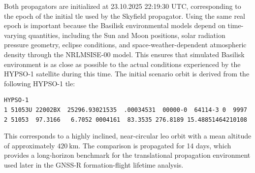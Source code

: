 Both propagators are initialized at 23.10.2025 22:19:30 UTC, corresponding to the epoch of the initial \gls{tle} used by the Skyfield propagator. Using the same real epoch is important because the Basilisk environmental models depend on time-varying quantities, including the Sun and Moon positions, solar radiation pressure geometry, eclipse conditions, and space-weather-dependent atmospheric density through the NRLMSISE-00 model. This ensures that simulated Basilisk environment is as close as possible to the actual conditions experienced by the HYPSO-1 satellite during this time. The initial scenario orbit is derived from the following HYPSO-1 \gls{tle}:
\begin{verbatim}
HYPSO-1
1 51053U 22002BX  25296.93021535  .00034531  00000-0  64114-3 0  9997
2 51053  97.3166   6.7052 0004161  83.3535 276.8189 15.48851464210108
\end{verbatim}
This corresponds to a highly inclined, near-circular \gls{leo} orbit with a mean altitude of approximately $420~\mathrm{km}$. The comparison is propagated for 14 days, which provides a long-horizon benchmark for the translational propagation environment used later in the GNSS-R formation-flight lifetime analysis.
